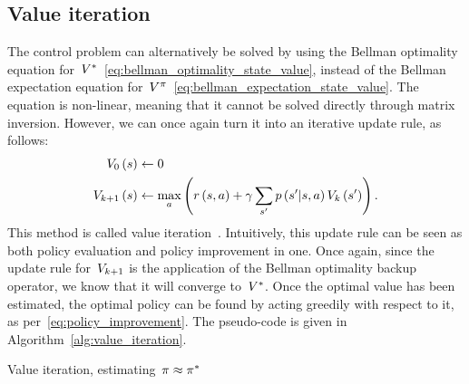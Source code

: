 \subsection{Value iteration} \label{sec:value_iteration}
The control problem can alternatively be solved by using the Bellman optimality equation for~${V^{*}}$~\eqref{eq:bellman_optimality_state_value}, instead of the Bellman expectation equation for~${V^{\pi}}$~\eqref{eq:bellman_expectation_state_value}. The equation is non-linear, meaning that it cannot be solved directly through matrix inversion. However, we can once again turn it into an iterative update rule, as follows:
\begin{equation}
\begin{split}
	\estimatestatevalue_{0}\left(\state\right)&\gets0 \\
	\estimatestatevalue_{\indexletter+1}\left(\state\right)&\gets\max_{\action}\left(\immediatereward\left(\state,\action\right)+\discount\sum_{\state'}\transition\left(\state'\middle\vert\state,\action\right)\estimatestatevalue_{\indexletter}\left(\state'\right)\right).
\end{split}
\end{equation}
This method is called value iteration~{\cite{bellman1957dynamic}}. Intuitively, this update rule can be seen as both policy evaluation and policy improvement in one. Once again, since the update rule for~${\estimatestatevalue_{\indexletter+1}}$ is the application of the Bellman optimality backup operator, we know that it will converge to~${V^{*}}$. Once the optimal value has been estimated, the optimal policy can be found by acting greedily with respect to it, as per~\eqref{eq:policy_improvement}. The pseudo-code is given in Algorithm~\ref{alg:value_iteration}.
\begin{algorithm}
	\caption{Value iteration, estimating~${\pi\approx\pi^{*}}$}
	\label{alg:value_iteration}
	
\end{algorithm}

